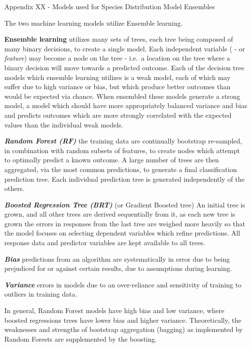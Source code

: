 \documentclass[
]{article}
\begin{document}
\newpage

Appendix XX - Models used for Species Distribution Model Ensembles

The two machine learning models utilize Ensemble learning.

\textbf{Ensemble learning} utilizes many sets of trees, each tree being
composed of many binary decisions, to create a single model. Each
independent variable ( - or \emph{feature}) may become a node on the
tree - i.e.~a location on the tree where a binary decision will move
towards a predicted outcome. Each of the decision tree models which
ensemble learning utilizes is a weak model, each of which may suffer due
to high variance or bias, but which produce better outcomes than would
be expected via chance. When ensembled these models generate a strong
model, a model which should have more appropriately balanced variance
and bias and predicts outcomes which are more strongly correlated with
the expected values than the individual weak models.

\emph{\textbf{Random Forest (RF)}} the training data are continually
bootstrap re-sampled, in combination with random subsets of features, to
create nodes which attempt to optimally predict a known outcome. A large
number of trees are then aggregated, via the most common predictions, to
generate a final classification prediction tree. Each individual
prediction tree is generated independently of the others.

\emph{\textbf{Boosted Regression Tree (BRT)}} (or Gradient Boosted tree)
An initial tree is grown, and all other trees are derived sequentially
from it, as each new tree is grown the errors in responses from the last
tree are weighed more heavily so that the model focuses on selecting
dependent variables which refine predictions. All response data and
predictor variables are kept available to all trees.

\emph{\textbf{Bias}} predictions from an algorithm are systematically in
error due to being prejudiced for or against certain results, due to
assumptions during learning.

\emph{\textbf{Variance}} errors in models due to an over-reliance and
sensitivity of training to outliers in training data.

In general, Random Forest models have high bias and low variance, where
boosted regressions trees have lower bias and higher variance.
Theoretically, the weaknesses and strengths of bootstrap aggregation
(bagging) as implemented by Random Forests are supplemented by the
boosting.
\end{document}
